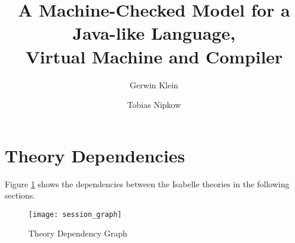 \documentclass[11pt,a4paper]{book}
\begin{document}
\title{A Machine-Checked Model for a Java-like Language,\\
       Virtual Machine and Compiler}
\author{Gerwin Klein \and Tobias Nipkow}
\maketitle


\tableofcontents

\section{Theory Dependencies}

Figure \ref{theory-deps} shows the dependencies between 
the Isabelle theories in the following sections.

\begin{figure}[h!t]
\begin{center}
  \texttt{[image: session\_graph]}
\end{center}
\caption{Theory Dependency Graph\label{theory-deps}}
\end{figure}

\newpage

\end{document}
